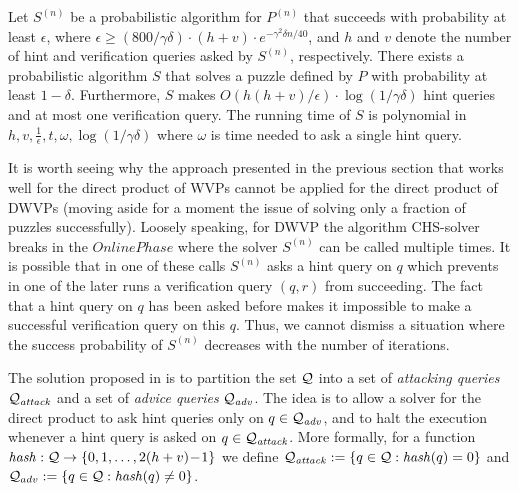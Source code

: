 \begin{theorem}
\label{lemma:dwvp}
Let $S^{(n)}$ be a probabilistic algorithm for $P^{(n)}$ that succeeds with
probability at least $\epsilon$, where $\epsilon \geq (800/\gamma\delta) \cdot (h+v) \cdot e^{-\gamma^2\delta n/40}$, and $h$ and $v$
denote the number of hint and verification queries asked by $S^{(n)}$, respectively.
There exists a probabilistic algorithm $S$ that solves a puzzle defined by $P$ with probability at least $1-\delta$.
Furthermore, $S$ makes $O(h(h+v)/\epsilon) \cdot \log(1/\gamma\delta)$ hint queries and at most one verification query.
The running time of $S$ is polynomial in $h,v,\frac{1}{\epsilon}, t, \omega, \log(1/\gamma\delta)$ where
$\omega$ is time needed to ask a single hint query.
\end{theorem}

It is worth seeing why the approach presented in the previous section that works well for the direct product of WVPs
cannot be applied for the direct product of DWVPs (moving aside for a moment the issue of solving only a fraction of puzzles successfully).
Loosely speaking, for DWVP the algorithm CHS-solver breaks in the $\mathit{OnlinePhase}$ where the solver $S^{(n)}$ can be called multiple times.
It is possible that in one of these calls $S^{(n)}$ asks a hint query on $q$
which prevents in one of the later runs a verification query $(q,r)$ from succeeding.
The fact that a hint query on $q$ has been asked before makes it impossible to make a successful verification query on this $q$.
Thus, we cannot dismiss a situation where the success probability of $S^{(n)}$ decreases with the number of iterations.

The solution proposed in \cite{dodis2009security} is to partition the set $\mathcal{Q}$ into a set of \textit{attacking queries} $\mathcal{Q}_{\mathit{attack}}$
and a set of \textit{advice queries} $\mathcal{Q}_{\mathit{adv}}$. The idea is to allow a solver for the direct product to ask hint
queries only on $q \in \mathcal{Q}_{\mathit{adv}}$, and to halt the execution whenever a hint query is asked on $q \in \mathcal{Q}_{\mathit{attack}}$.
More formally, for a function $\operatorname{\mathit{hash}}:\mathcal{Q} \rightarrow \{0,1,\dotsc, 2(h+v)\!-\!1 \}$
we define $\mathcal{Q}_{\mathit{attack}} := \{q \in \mathcal{Q} : \operatorname{\mathit{hash}}(q) = 0 \}$ and $\mathcal{Q}_{adv} := \{q \in \mathcal{Q}: \operatorname{\mathit{hash}}(q) \neq 0\}$.

